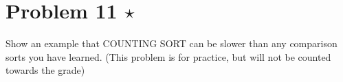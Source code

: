 \documentclass[10pt]{article}
\begin{document}
%

\section*{Problem 11 $\star$}
Show an example that COUNTING SORT can be slower than any comparison sorts you have learned. (This problem is for practice,  but will not be counted towards the grade)
\end{document}
